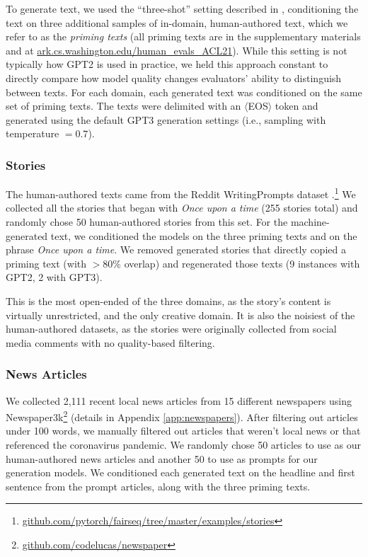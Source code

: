 To generate text, we used the ``three-shot'' setting described in \citet{gpt3}, conditioning the text on three additional samples of in-domain, human-authored text, which we refer to as the \textit{priming texts} (all priming texts are in the supplementary materials and at \url{ark.cs.washington.edu/human_evals_ACL21}).
While this setting is not typically how GPT2 is used in practice, we held this approach constant to directly compare how model quality changes evaluators' ability to distinguish between texts.
For each domain, each generated text was conditioned on the same set of priming texts.
The texts were delimited with an $\langle$EOS$\rangle$ token and generated using the default GPT3 generation settings (i.e., sampling with temperature $=0.7$).

\subsubsection{Stories}
The human-authored texts came from the Reddit WritingPrompts dataset \citep{fan-etal-2018-hierarchical}.\footnote{\url{github.com/pytorch/fairseq/tree/master/examples/stories}} 
We collected all the stories that began with \textit{Once upon a time} (255 stories total) and randomly chose 50 human-authored stories from this set. For the machine-generated text, we conditioned the models on the three priming texts and on the phrase \textit{Once upon a time}.
We removed generated stories that directly copied a priming text (with $>80\%$ overlap) and regenerated those texts (9 instances with GPT2, 2 with GPT3).

This is the most open-ended of the three domains, as the story's content is virtually unrestricted, and the only creative domain.
It is also the noisiest of the human-authored datasets, as the stories were originally collected from social media comments with no quality-based filtering.

\subsubsection{News Articles}
We collected 2,111 recent local news articles from 15 different newspapers using Newspaper3k\footnote{\url{github.com/codelucas/newspaper}} (details in Appendix \ref{app:newspapers}).
After filtering out articles under 100 words, we manually filtered out articles that weren't local news or that referenced the coronavirus pandemic.
We randomly chose 50 articles to use as our human-authored news articles and another 50 to use as prompts for our generation models. 
We conditioned each generated text on the headline and first sentence from the prompt articles, along with the three priming texts.

